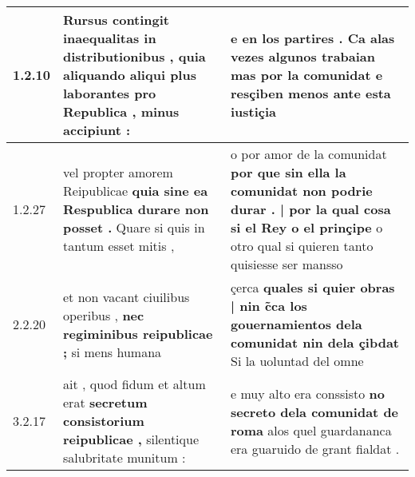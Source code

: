 \begin{tabular}{|p{1cm}|p{6.5cm}|p{6.5cm}|}

\hline
1.2.10 & Rursus contingit inaequalitas in distributionibus , \textbf{ quia aliquando aliqui plus laborantes pro Republica , } minus accipiunt : & e en los partires . \textbf{ Ca alas vezes algunos trabaian mas por la comunidat } e resçiben menos ante esta iustiçia \\\hline
1.2.27 & vel propter amorem Reipublicae \textbf{ quia sine ea Respublica durare non posset . } Quare si quis in tantum esset mitis , & o por amor de la comunidat \textbf{ por que sin ella la comunidat non podrie durar . | por la qual cosa si el Rey o el prinçipe } o otro qual si quieren tanto quisiesse ser mansso \\\hline
2.2.20 & et non vacant ciuilibus operibus , \textbf{ nec regiminibus reipublicae ; } si mens humana & çerca \textbf{ quales si quier obras | nin c̃ca los gouernamientos dela comunidat nin dela çibdat } Si la uoluntad del omne \\\hline
3.2.17 & ait , quod fidum et altum erat \textbf{ secretum consistorium reipublicae , } silentique salubritate munitum : & e muy alto era conssisto \textbf{ no secreto dela comunidat de roma } alos quel guardananca era guaruido de grant fialdat . \\\hline

\end{tabular}
